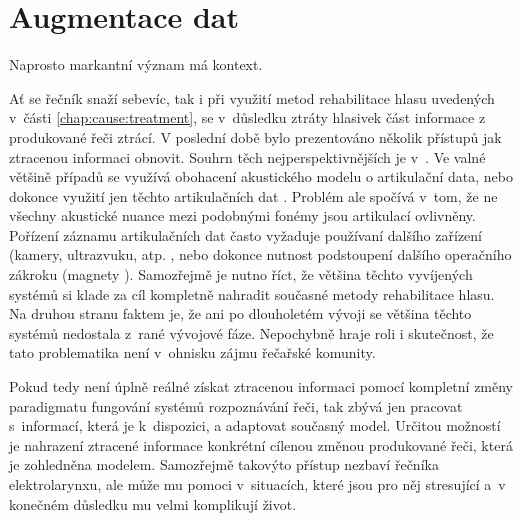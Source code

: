 \section{Augmentace dat}
\label{chap:realisation:augmentation}

Naprosto markantní význam má kontext.

Ať se řečník snaží sebevíc, tak i při využití metod rehabilitace hlasu uvedených v~části \ref{chap:cause:treatment}, se v~důsledku ztráty hlasivek část informace z produkované řeči ztrácí.
V poslední době bylo prezentováno několik přístupů jak ztracenou informaci obnovit.
Souhrn těch nejperspektivnějších je v~\cite{Denby2010}.
Ve valné většině případů se využívá obohacení akustického modelu o artikulační data, nebo dokonce využití jen těchto artikulačních dat \cite{Hofe2013} .
Problém ale spočívá v~tom, že ne všechny akustické nuance mezi podobnými fonémy jsou artikulací ovlivněny.
Pořízení záznamu artikulačních dat často vyžaduje používaní dalšího zařízení (kamery, ultrazvuku, atp. \cite{Hueber2010, Fagan2008, Jorgensen2010, Hirahara2010},
nebo dokonce nutnost podstoupení dalšího operačního zákroku (magnety \cite{Hofe2011}).
Samozřejmě je nutno říct, že většina těchto vyvíjených systémů si klade za cíl kompletně nahradit současné metody rehabilitace hlasu.
Na druhou stranu faktem je, že ani po dlouholetém vývoji se většina těchto systémů nedostala z~rané vývojové fáze.
Nepochybně hraje roli i skutečnost, že tato problematika není v~ohnisku zájmu řečařské komunity.

Pokud tedy není úplně reálné získat ztracenou informaci pomocí kompletní změny paradigmatu fungování systémů rozpoznávání řeči, tak zbývá jen pracovat s~informací, která je  k~dispozici, a adaptovat současný model.
Určitou možností je nahrazení ztracené informace konkrétní cílenou změnou produkované řeči,
která je zohledněna modelem.
Samozřejmě takovýto přístup nezbaví řečníka elektrolarynxu, ale může mu pomoci v~situacích, které jsou pro něj stresující a~v konečném důsledku mu velmi komplikují život.

